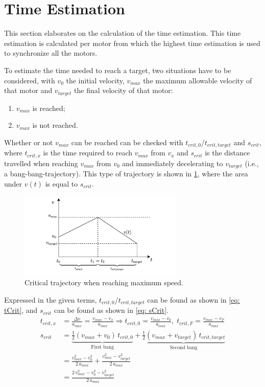 \section{Time Estimation}
\label{sec:timeEst}
This section elaborates on the calculation of the time estimation. This time estimation is calculated per motor from which the highest time estimation is used to synchronize all the motors.

To estimate the time needed to reach a target, two situations have to be considered, with $v_0$ the initial velocity, $v_{max}$ the maximum allowable velocity of that motor and $v_{target}$ the final velocity of that motor:
\begin{enumerate}
    \item $v_{max}$ is reached;
    \item $v_{max}$ is not reached.
\end{enumerate}

\noindent Whether or not $v_{max}$ can be reached can be checked with $t_{crit,0}$/$t_{crit,target}$ and $s_{crit}$, where $t_{crit,x}$ is the time required to reach $v_{max}$ from $v_x$ and $s_{crit}$ is the distance travelled when reaching $v_{max}$ from $v_0$ and immediately decelerating to $v_{target}$ (i.e., a bang-bang-trajectory). This type of trajectory is shown in \cref{fig: MSC_crit}, where the area under $v(t)$ is equal to $s_{crit}$. 

\begin{figure}[!hbt]
    \centering
    \includegraphics[width=0.7\textwidth]{figures/MotorSpeedCalculations/MSC_crit_trajectory.png}
    \caption{Critical trajectory when reaching maximum speed.}
    \label{fig: MSC_crit}
\end{figure}

\noindent Expressed in the given terms, $t_{crit,0}$/$t_{crit,target}$ can be found as shown in \cref{eq: tCrit}, and $s_{crit}$ can be found as shown in \cref{eq: sCrit}. 
\begin{align}
    t_{crit,x} &= \frac{\Delta v}{a_{max}} = \frac{v_{max}-v_x}{a_{max}} \Rightarrow t_{crit,0} = \frac{v_{max} - v_0}{a_{max}}, \; t_{crit,F} = \frac{v_{max} - v_F}{a_{max}} \label{eq: tCrit} \\
    s_{crit} &= \underbrace{\frac{1}{2} (v_{max}+v_0) \,  t_{crit,0}}_{\text{First bang}} + \underbrace{\frac{1}{2} (v_{max}+v_{target}) \, t_{crit,target}}_{\text{Second bang}}\nonumber \\
    & =\frac{v_{max}^2-v_0^2}{2 \, a_{max}}  + \frac{v_{max}^2-v_{target}^2}{2 \, a_{max}} \nonumber\\
    &= \frac{2 \, v_{max}^2-v_0^2 - v_{target}^2}{2 \, a_{max}} \label{eq: sCrit}
\end{align}

